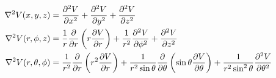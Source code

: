 \begin{align*}
	\nabla^2 V(x,y,z) &= \frac{\p^2 V}{\p x^2} + \frac{\p^2 V}{\p y^2} + \frac{\p^2 V}{\p z^2} \\
%
	\nabla^2 V(r,\phi,z) &=%
		\frac{1}{r} \frac{\p}{\p r} \left( r \frac{\p V}{\p r} \right) +%
		\frac{1}{r^2} \frac{\p^2 V}{\p \phi^2} +%
		\frac{\p^2 V}{\p z^2} \\
%
	\nabla^2 V(r,\theta,\phi) &=%
		\frac{1}{r^2} \frac{\p}{\p r} \left( r^2 \frac{\p V}{\p r} \right) +%
		\frac{1}{r^2 \sin \theta} \frac{\p}{\p \theta} \left( \sin \theta \frac{\p V}{\p \theta} \right) +%
		\frac{1}{r^2 \sin^2 \theta} \frac{\p^2 V}{\p \theta^2}
\end{align*}
